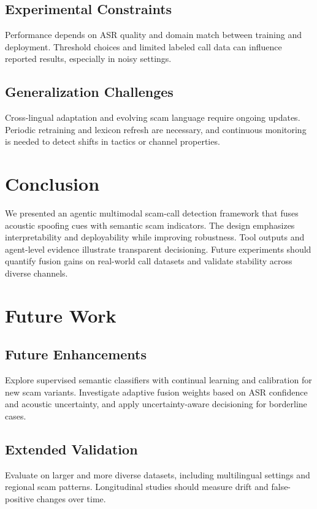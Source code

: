 \documentclass[11pt,a4paper]{article}
\begin{document}
\subsection{Experimental Constraints}
Performance depends on ASR quality and domain match between training and deployment. Threshold choices and limited labeled call data can influence reported results, especially in noisy settings.

\subsection{Generalization Challenges}
Cross-lingual adaptation and evolving scam language require ongoing updates. Periodic retraining and lexicon refresh are necessary, and continuous monitoring is needed to detect shifts in tactics or channel properties.

\section{Conclusion}
We presented an agentic multimodal scam-call detection framework that fuses acoustic spoofing cues with semantic scam indicators. The design emphasizes interpretability and deployability while improving robustness. Tool outputs and agent-level evidence illustrate transparent decisioning. Future experiments should quantify fusion gains on real-world call datasets and validate stability across diverse channels.

\section{Future Work}
\subsection{Future Enhancements}
Explore supervised semantic classifiers with continual learning and calibration for new scam variants. Investigate adaptive fusion weights based on ASR confidence and acoustic uncertainty, and apply uncertainty-aware decisioning for borderline cases.

\subsection{Extended Validation}
Evaluate on larger and more diverse datasets, including multilingual settings and regional scam patterns. Longitudinal studies should measure drift and false-positive changes over time.
\end{document}
